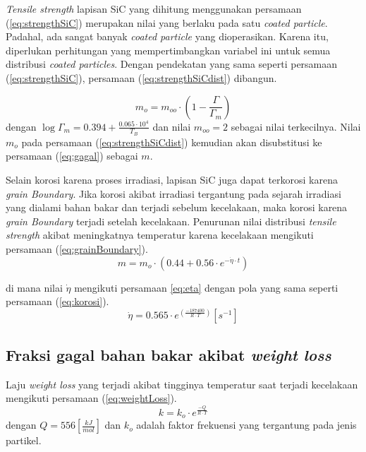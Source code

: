 \documentclass[a4paper,11pt]{report}
\begin{document}
\textit{Tensile strength} lapisan SiC yang dihitung menggunakan persamaan (\ref{eq:strengthSiC}) merupakan nilai yang berlaku pada satu \textit{coated particle}. Padahal, ada sangat banyak \textit{coated particle} yang dioperasikan. Karena itu, diperlukan perhitungan yang mempertimbangkan variabel ini untuk semua distribusi \textit{coated particles}. Dengan pendekatan yang sama seperti persamaan (\ref{eq:strengthSiC}), persamaan (\ref{eq:strengthSiCdist}) dibangun.

\begin{equation}
  m_o = m_{oo} \cdot \left( 1- \frac{\Gamma}{\Gamma_m} \right)
  \label{eq:strengthSiCdist}
\end{equation}
dengan $\log \Gamma_m = 0.394 + \frac{0.065 \cdot 10^4}{T_B}$ dan nilai $m_{oo}=2$ sebagai nilai terkecilnya. Nilai $m_o$ pada persamaan (\ref{eq:strengthSiCdist}) kemudian akan disubstitusi ke persamaan (\ref{eq:gagal}) sebagai $m$.


Selain korosi karena proses irradiasi, lapisan SiC juga dapat terkorosi karena \textit{grain Boundary}. Jika korosi akibat irradiasi tergantung pada sejarah irradiasi yang dialami bahan bakar dan terjadi sebelum kecelakaan, maka korosi karena \textit{grain Boundary} terjadi setelah kecelakaan. Penurunan nilai distribusi \textit{tensile strength} akibat meningkatnya temperatur karena kecelakaan mengikuti persamaan (\ref{eq:grainBoundary}).
\begin{equation}
  m=m_o \cdot \left( 0.44 + 0.56 \cdot e^{-\dot{\eta} \cdot t}\right)
  \label{eq:grainBoundary}
\end{equation}

di mana nilai $\dot{\eta}$ mengikuti persamaan {\ref{eq:eta}} dengan pola yang sama seperti persamaan (\ref{eq:korosi}).
\begin{equation}
  \dot{\eta}=0.565 \cdot e^{\left(\frac{-187400}{R \cdot T}\right)} [s^{-1}]
  \label{eq:eta}
\end{equation}

\subsection{Fraksi gagal bahan bakar akibat \textit{weight loss}}
Laju \textit{weight loss} yang terjadi akibat tingginya temperatur saat terjadi kecelakaan mengikuti persamaan (\ref{eq:weightLoss}).
\begin{equation}
  k=k_o \cdot e^{\frac{-Q}{R \cdot T}}
  \label{eq:weightLoss}
\end{equation}
dengan $Q=556 \left[ \frac{kJ}{mol}\right]$ dan $k_o$ adalah faktor frekuensi yang tergantung pada jenis partikel.
\end{document}
